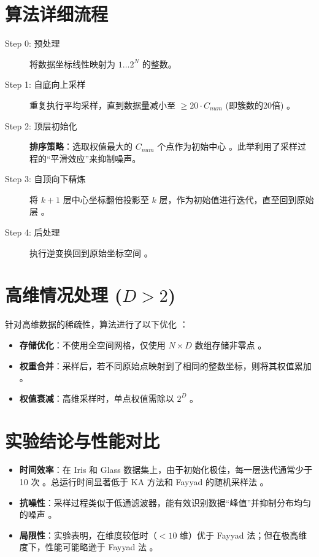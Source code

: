 \documentclass[11pt,a4paper]{article}
\begin{document}
\section{算法详细流程}

\begin{tcolorbox}[title=分层初始化算法步骤]
\begin{description}
    \item[Step 0: 预处理] 将数据坐标线性映射为 $1 \dots 2^N$ 的整数。
    \item[Step 1: 自底向上采样] 重复执行平均采样，直到数据量减小至 $\ge 20 \cdot C_{num}$ (即簇数的20倍) 。
    \item[Step 2: 顶层初始化] \textbf{排序策略}：选取权值最大的 $C_{num}$ 个点作为初始中心 。此举利用了采样过程的“平滑效应”来抑制噪声。
    \item[Step 3: 自顶向下精炼] 将 $k+1$ 层中心坐标翻倍投影至 $k$ 层，作为初始值进行迭代，直至回到原始层 。
    \item[Step 4: 后处理] 执行逆变换回到原始坐标空间 。
\end{description}
\end{tcolorbox}

\section{高维情况处理 ($D > 2$)}
针对高维数据的稀疏性，算法进行了以下优化 ：
\begin{itemize}
    \item \textbf{存储优化}：不使用全空间网格，仅使用 $N \times D$ 数组存储非零点 。
    \item \textbf{权重合并}：采样后，若不同原始点映射到了相同的整数坐标，则将其权值累加 。
    \item \textbf{权值衰减}：高维采样时，单点权值需除以 $2^D$ 。
\end{itemize}

\section{实验结论与性能对比}
\begin{itemize}
    \item \textbf{时间效率}：在 Iris 和 Glass 数据集上，由于初始化极佳，每一层迭代通常少于 10 次 。总运行时间显著低于 KA 方法和 Fayyad 的随机采样法 。
    \item \textbf{抗噪性}：采样过程类似于低通滤波器，能有效识别数据“峰值”并抑制分布均匀的噪声 。
    \item \textbf{局限性}：实验表明，在维度较低时（$<10$ 维）优于 Fayyad 法；但在极高维度下，性能可能略逊于 Fayyad 法 。
\end{itemize}
\end{document}
